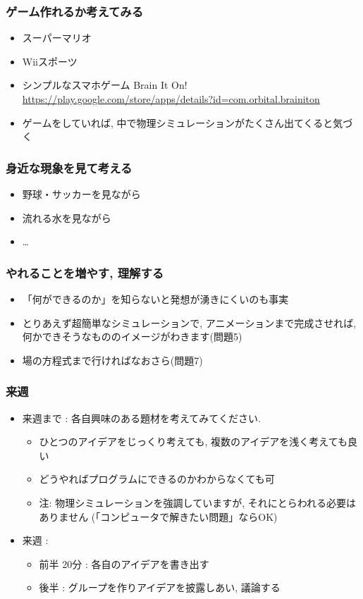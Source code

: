 \documentclass[12pt,dvipdfmx]{beamer}
\begin{document}
\begin{frame}
  \frametitle{ゲーム作れるか考えてみる}
  \begin{itemize}
  \item スーパーマリオ
  \item Wiiスポーツ
  \item シンプルなスマホゲーム Brain It On!
    \url{https://play.google.com/store/apps/details?id=com.orbital.brainiton}
  \item ゲームをしていれば,
    中で物理シミュレーションがたくさん出てくると気づく
  \end{itemize}
\end{frame}

\begin{frame}
  \frametitle{身近な現象を見て考える}
  \begin{itemize}
  \item 野球・サッカーを見ながら
  \item 流れる水を見ながら
  \item \ldots
  \end{itemize}
\end{frame}

\begin{frame}
  \frametitle{やれることを増やす, 理解する}
  \begin{itemize}
  \item 「何ができるのか」を知らないと発想が湧きにくいのも事実
  \item とりあえず超簡単なシミュレーションで,
    アニメーションまで完成させれば,
    何かできそうなもののイメージがわきます(問題5)
  \item 場の方程式まで行ければなおさら(問題7)
  \end{itemize}
\end{frame}

\begin{frame}
  \frametitle{来週}
  \begin{itemize}
  \item 来週まで : 各自興味のある題材を考えてみてください.
    \begin{itemize}
    \item ひとつのアイデアをじっくり考えても, 複数のアイデアを浅く考えても良い
    \item どうやればプログラムにできるのかわからなくても可
    \item 注: 物理シミュレーションを強調していますが,
      それにとらわれる必要はありません
      (「コンピュータで解きたい問題」ならOK)
    \end{itemize}
  \item 来週 :
    \begin{itemize}
    \item 前半 20分 : 各自のアイデアを書き出す
    \item 後半 : グループを作りアイデアを披露しあい, 議論する
    \end{itemize}
  \end{itemize}
\end{frame}
\end{document}
